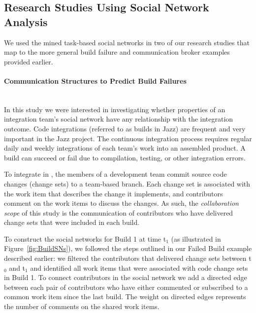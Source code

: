 

\subsection{Research Studies Using Social Network Analysis}
We used the mined task-based social networks in two of our research studies that
map to the more general build failure \cite{wolf:tr2008} and communication
broker \cite{Nguyen:2008Distance} examples provided earlier.

\paragraph{Communication Structures to Predict Build Failures}
\ \\
In this study we were interested in investigating whether properties of an
integration team's social network have any relationship with the integration
outcome. Code integrations (referred  to  as builds in Jazz)  are frequent and
very important in the Jazz project. The continuous integration process requires
regular daily and weekly integrations of each team's work into an assembled
product. A build can succeed or fail due to compilation, testing, or other
integration errors.

To integrate in \jazztm, the members of a development team commit source code
changes (change sets) to a team-based branch. Each change set is associated with
the work item that describes the change it implements, and contributors comment
on the work items to discuss the changes. As such, the \emph{collaboration scope}
of this study is the communication of contributors who have delivered change sets
that were included in each build. 


To construct the social networks for Build 1 at time t$_1$ (as illustrated in
Figure~\ref{fig:BuildSNs}), we followed the steps outlined in our Failed Build
example described earlier: we filtered the contributors that delivered change
sets between t$_0$ and t$_1$ and identified all work items that were associated
with code change sets in Build 1. To connect contributors in the social network
we add a directed edge between each pair of contributors who have either
commented or subscribed to a common work item since the last build. The weight on
directed edges represents the number of comments on the shared work items.

